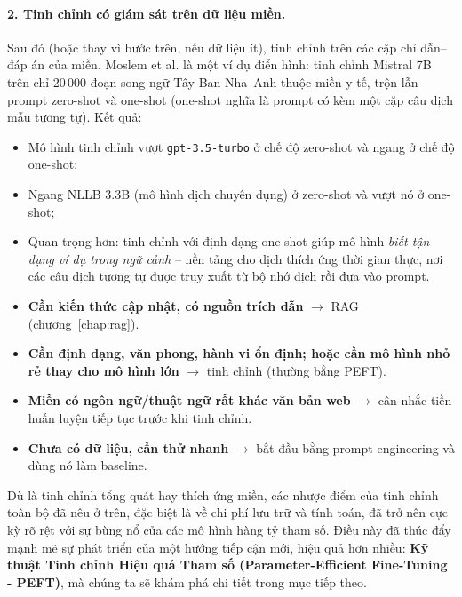 \paragraph{2. Tinh chỉnh có giám sát trên dữ liệu miền.} Sau đó (hoặc thay vì bước trên, nếu dữ liệu ít), tinh chỉnh trên các cặp chỉ dẫn--đáp án của miền. Moslem et al. \cite{moslem2023adaptivemt} là một ví dụ điển hình: tinh chỉnh Mistral 7B trên chỉ 20\,000 đoạn song ngữ Tây Ban Nha--Anh thuộc miền y tế, trộn lẫn prompt zero-shot và one-shot (one-shot nghĩa là prompt có kèm một cặp câu dịch mẫu tương tự). Kết quả:
\begin{itemize}
	\item Mô hình tinh chỉnh vượt \texttt{gpt-3.5-turbo} ở chế độ zero-shot và ngang ở chế độ one-shot;
	\item Ngang NLLB 3.3B (mô hình dịch chuyên dụng) ở zero-shot và vượt nó ở one-shot;
	\item Quan trọng hơn: tinh chỉnh với định dạng one-shot giúp mô hình \emph{biết tận dụng ví dụ trong ngữ cảnh} -- nền tảng cho dịch thích ứng thời gian thực, nơi các câu dịch tương tự được truy xuất từ bộ nhớ dịch rồi đưa vào prompt.
\end{itemize}

\begin{tcolorbox}[title={Khi nào tinh chỉnh, khi nào dùng RAG hay prompt?}, colback=yellow!10!white, colframe=yellow!50!black, fonttitle=\bfseries]
\begin{itemize}
	\item \textbf{Cần kiến thức cập nhật, có nguồn trích dẫn} $\rightarrow$ RAG (chương~\ref{chap:rag}).
	\item \textbf{Cần định dạng, văn phong, hành vi ổn định; hoặc cần mô hình nhỏ rẻ thay cho mô hình lớn} $\rightarrow$ tinh chỉnh (thường bằng PEFT).
	\item \textbf{Miền có ngôn ngữ/thuật ngữ rất khác văn bản web} $\rightarrow$ cân nhắc tiền huấn luyện tiếp tục trước khi tinh chỉnh.
	\item \textbf{Chưa có dữ liệu, cần thử nhanh} $\rightarrow$ bắt đầu bằng prompt engineering và dùng nó làm baseline.
\end{itemize}
\end{tcolorbox}

Dù là tinh chỉnh tổng quát hay thích ứng miền, các nhược điểm của tinh chỉnh toàn bộ đã nêu ở trên, đặc biệt là về chi phí lưu trữ và tính toán, đã trở nên cực kỳ rõ rệt với sự bùng nổ của các mô hình hàng tỷ tham số. Điều này đã thúc đẩy mạnh mẽ sự phát triển của một hướng tiếp cận mới, hiệu quả hơn nhiều: \textbf{Kỹ thuật Tinh chỉnh Hiệu quả Tham số (Parameter-Efficient Fine-Tuning - PEFT)}, mà chúng ta sẽ khám phá chi tiết trong mục tiếp theo.